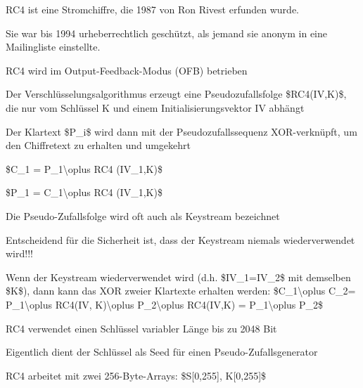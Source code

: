 \documentclass[a4paper]{article}
\begin{document}
\begin{multicols}{3}
      \begin{itemize*}
            \item RC4 ist eine Stromchiffre, die 1987 von Ron Rivest erfunden wurde.
            \item Sie war bis 1994 urheberrechtlich geschützt, als jemand sie anonym in
            eine Mailingliste einstellte.
            \item RC4 wird im Output-Feedback-Modus (OFB) betrieben
            \begin{itemize*}
                  \item Der Verschlüsselungsalgorithmus erzeugt eine Pseudozufallsfolge \$RC4(IV,K)\$, die nur vom Schlüssel K und einem Initialisierungsvektor IV abhängt
                  \item Der Klartext \$P\_i\$ wird dann mit der Pseudozufallssequenz XOR-verknüpft, um den Chiffretext zu erhalten und umgekehrt
                  \begin{itemize*} \item \$C\_1 = P\_1\textbackslash oplus RC4 (IV\_1,K)\$ \item \$P\_1 = C\_1\textbackslash oplus RC4 (IV\_1,K)\$ \end{itemize*}
                  \item Die Pseudo-Zufallsfolge wird oft auch als Keystream bezeichnet
                  \item Entscheidend für die Sicherheit ist, dass der Keystream niemals wiederverwendet wird!!!
                  \begin{itemize*} \item Wenn der Keystream wiederverwendet wird (d.h. \$IV\_1=IV\_2\$ mit demselben \$K\$), dann kann das XOR zweier Klartexte erhalten werden: \$C\_1\textbackslash oplus C\_2= P\_1\textbackslash oplus RC4(IV, K)\textbackslash oplus P\_2\textbackslash oplus RC4(IV,K) = P\_1\textbackslash oplus P\_2\$ \end{itemize*}
            \end{itemize*}
            \item RC4 verwendet einen Schlüssel variabler Länge bis zu 2048 Bit
            \begin{itemize*}
                  \item Eigentlich dient der Schlüssel als Seed für einen Pseudo-Zufallsgenerator
            \end{itemize*}
            \item RC4 arbeitet mit zwei 256-Byte-Arrays: \$S{[}0,255{]}, K{[}0,255{]}\$
            \begin{itemize*}

\end{itemize*}
\end{itemize*}
\end{multicols}
\end{document}
